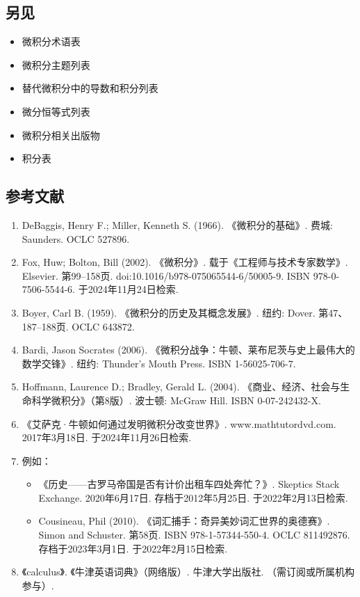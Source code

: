 \subsection{另见}   
\begin{itemize}
\item 微积分术语表  
\item 微积分主题列表  
\item 替代微积分中的导数和积分列表  
\item 微分恒等式列表  
\item 微积分相关出版物  
\item 积分表
\end{itemize}
\subsection{参考文献}  
\begin{enumerate}
\item DeBaggis, Henry F.; Miller, Kenneth S. (1966). 《微积分的基础》. 费城: Saunders. OCLC 527896.  
\item Fox, Huw; Bolton, Bill (2002). 《微积分》. 载于《工程师与技术专家数学》. Elsevier. 第99–158页. doi:10.1016/b978-075065544-6/50005-9. ISBN 978-0-7506-5544-6. 于2024年11月24日检索.  
\item Boyer, Carl B. (1959). 《微积分的历史及其概念发展》. 纽约: Dover. 第47、187–188页. OCLC 643872.  
\item Bardi, Jason Socrates (2006). 《微积分战争：牛顿、莱布尼茨与史上最伟大的数学交锋》. 纽约: Thunder's Mouth Press. ISBN 1-56025-706-7.  
\item Hoffmann, Laurence D.; Bradley, Gerald L. (2004). 《商业、经济、社会与生命科学微积分》（第8版）. 波士顿: McGraw Hill. ISBN 0-07-242432-X.  
\item 《艾萨克·牛顿如何通过发明微积分改变世界》. www.mathtutordvd.com. 2017年3月18日. 于2024年11月26日检索.  
\item 例如：  
\begin{itemize}
\item 《历史——古罗马帝国是否有计价出租车四处奔忙？》. Skeptics Stack Exchange. 2020年6月17日. 存档于2012年5月25日. 于2022年2月13日检索.  
\item Cousineau, Phil (2010). 《词汇捕手：奇异美妙词汇世界的奥德赛》. Simon and Schuster. 第58页. ISBN 978-1-57344-550-4. OCLC 811492876. 存档于2023年3月1日. 于2022年2月15日检索. 
\end{itemize} 
\item 《calculus》. 《牛津英语词典》（网络版）. 牛津大学出版社. （需订阅或所属机构参与）.  

\end{enumerate}
